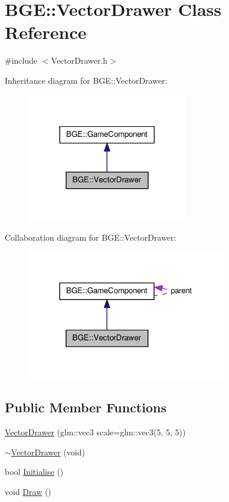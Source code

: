 \hypertarget{class_b_g_e_1_1_vector_drawer}{\section{B\-G\-E\-:\-:Vector\-Drawer Class Reference}
\label{class_b_g_e_1_1_vector_drawer}
}


{\ttfamily \#include $<$Vector\-Drawer.\-h$>$}



Inheritance diagram for B\-G\-E\-:\-:Vector\-Drawer\-:
\nopagebreak
\begin{figure}[H]
\begin{center}
\leavevmode
\includegraphics[width=200pt]{class_b_g_e_1_1_vector_drawer__inherit__graph}
\end{center}
\end{figure}


Collaboration diagram for B\-G\-E\-:\-:Vector\-Drawer\-:
\nopagebreak
\begin{figure}[H]
\begin{center}
\leavevmode
\includegraphics[width=249pt]{class_b_g_e_1_1_vector_drawer__coll__graph}
\end{center}
\end{figure}
\subsection*{Public Member Functions}
\begin{DoxyCompactItemize}
\item 
\hyperlink{class_b_g_e_1_1_vector_drawer_a894af20b565b766fc3cc5ee03944e4b1}{Vector\-Drawer} (glm\-::vec3 scale=glm\-::vec3(5, 5, 5))
\item 
\hyperlink{class_b_g_e_1_1_vector_drawer_aa7de2caf824fd1708dfd90305b3fe51f}{$\sim$\-Vector\-Drawer} (void)
\item 
bool \hyperlink{class_b_g_e_1_1_vector_drawer_aff3a17b54639d367ddc99b73e1b502ee}{Initialise} ()
\item 
void \hyperlink{class_b_g_e_1_1_vector_drawer_a30395d40e2e3e9afab90abbb7949bcf7}{Draw} ()
\end{DoxyCompactItemize}
